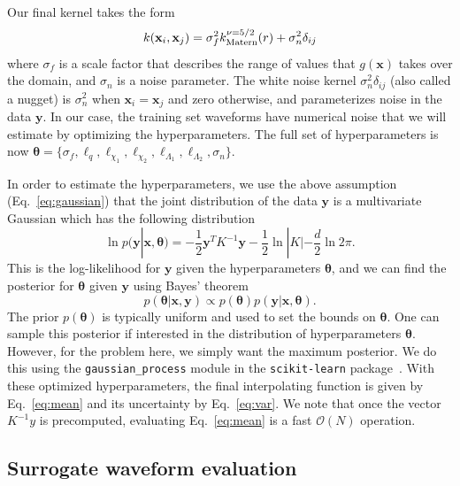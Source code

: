 \documentclass[prd,aps,letter,twocolumn,floatfix,notitlepage,nofootinbib]{revtex4-1}
\def\bx{\mathbf{x}}
\def\by{\mathbf{y}}
\def\btheta{\boldsymbol{\theta}}
\begin{document}
Our final kernel takes the form
\begin{equation}
k(\bx_i, \bx_j) = \sigma_f^2 k_{\rm Matern}^{\nu=5/2}(r) + \sigma_n^2 \delta_{ij}
\end{equation}
where $\sigma_f$ is a scale factor that describes the range of values that $g(\bx)$ takes over the domain, and $\sigma_n$ is a noise parameter. The white noise kernel $\sigma_n^2 \delta_{ij}$ (also called a nugget) is $\sigma_n^2$ when $\bx_i = \bx_j$ and zero otherwise, and parameterizes noise in the data $\by$. In our case, the training set waveforms have numerical noise that we will estimate by optimizing the hyperparameters. The full set of hyperparameters is now  $\btheta = \{\sigma_f, \ell_q, \ell_{\chi_1}, \ell_{\chi_2}, \ell_{\Lambda_1}, \ell_{\Lambda_2}, \sigma_n\}$.

In order to estimate the hyperparameters, we use the above assumption (Eq.~\eqref{eq:gaussian}) that the joint distribution of 
the data ${\bm y}$ is a multivariate Gaussian which has the following distribution
\begin{equation}
\ln p({\bm y} | {\bm x}, {\bm \theta}) = -\frac{1}{2}{\bm y}^T K^{-1} {\bm y} - \frac{1}{2} \ln |K| - \frac{d}{2} \ln 2\pi.
\end{equation}
This is the log-likelihood for ${\bm y}$ given the hyperparameters ${\bm \theta}$, and we can find the posterior for ${\bm \theta}$
given ${\bm y}$ using Bayes' theorem
\begin{equation}
p({\bm \theta} | {\bm x}, {\bm y}) \propto p({\bm \theta}) p({\bm y} | {\bm x}, {\bm \theta}).
\end{equation}
The prior $p({\bm \theta})$ is typically uniform and used to set the bounds on ${\bm \theta}$. One can sample this posterior if interested in the distribution of hyperparameters $\btheta$. However, for the problem here, we simply want the maximum posterior. We do this using the \texttt{gaussian\_process} module in the \texttt{scikit-learn} package~\cite{scikit-learn}. With these optimized hyperparameters, the final interpolating function is given by Eq.~\eqref{eq:mean} and its uncertainty by Eq.~\eqref{eq:var}. We note that once the vector $K^{-1}y$ is precomputed, evaluating Eq.~\eqref{eq:mean} is a fast $\mathcal{O}(N)$ operation.


\subsection{Surrogate waveform evaluation}
\end{document}
